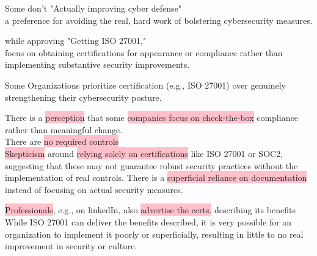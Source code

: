 \documentclass[tikz,border=10pt]{project_plan}
\begin{document}
Some don't "Actually improving cyber defense"\\
a preference for avoiding the real, hard work of bolstering cybersecurity measures.

while approving "Getting ISO 27001," \\
focus on obtaining certifications for appearance or compliance rather than
implementing substantive security improvements.

Some Organizations prioritize certification (e.g., ISO 27001) over genuinely
strengthening their cybersecurity posture.

There is a \colorbox{pink}{perception} that
some \colorbox{pink}{companies focus on check-the-box} compliance rather than meaningful change.\\

There are \colorbox{pink}{no required controls}\\
\colorbox{pink}{Skepticism} around \colorbox{pink}{relying solely on certifications} like
ISO 27001 or SOC2, suggesting that these may not guarantee robust security
practices without the implementation of real controls. There is a \colorbox{pink}{superficial
  reliance on documentation} instead of focusing on actual
security measures.

\colorbox{pink}{Professionals}, e.g., on linkedIn, also \colorbox{pink}{advertise the certs.} describing its benefits\\
While ISO 27001 can deliver the benefits described, it is very possible
for an organization to implement it poorly or superficially, resulting
in little to no real improvement in security or culture.
\end{document}
